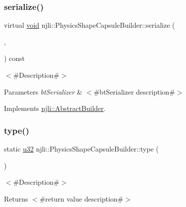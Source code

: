 \subsubsection{\texorpdfstring{serialize()}{serialize()}}
{\footnotesize\ttfamily virtual \mbox{\hyperlink{_thread_8h_af1e856da2e658414cb2456cb6f7ebc66}{void}} njli\+::\+Physics\+Shape\+Capsule\+Builder\+::serialize (\begin{DoxyParamCaption}\item[{\mbox{\hyperlink{_thread_8h_af1e856da2e658414cb2456cb6f7ebc66}{void}} $\ast$}]{,  }\item[{bt\+Serializer $\ast$}]{ }\end{DoxyParamCaption}) const\hspace{0.3cm}{\ttfamily [virtual]}}

$<$\#\+Description\#$>$


\begin{DoxyParams}{Parameters}
{\em bt\+Serializer} & $<$\#bt\+Serializer description\#$>$ \\
\hline
\end{DoxyParams}


Implements \mbox{\hyperlink{classnjli_1_1_abstract_builder_ab66b774e02ccb9da554c9aab7fa6d981}{njli\+::\+Abstract\+Builder}}.

\mbox{\label{classnjli_1_1_physics_shape_capsule_builder_ae351e11296275cf1cea9aed9c06d3346}} 
\subsubsection{\texorpdfstring{type()}{type()}}
{\footnotesize\ttfamily static \mbox{\hyperlink{_util_8h_a10e94b422ef0c20dcdec20d31a1f5049}{u32}} njli\+::\+Physics\+Shape\+Capsule\+Builder\+::type (\begin{DoxyParamCaption}{ }\end{DoxyParamCaption})\hspace{0.3cm}{\ttfamily [static]}}

$<$\#\+Description\#$>$

\begin{DoxyReturn}{Returns}
$<$\#return value description\#$>$ 
\end{DoxyReturn}



